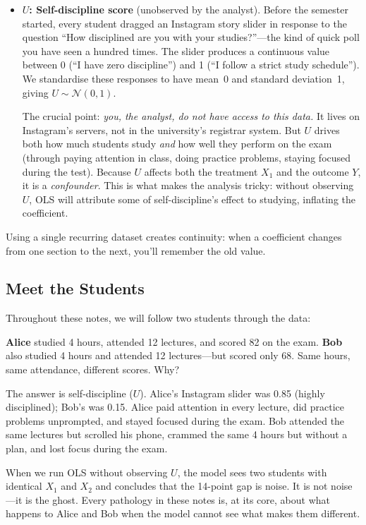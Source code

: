 \documentclass[11pt,a4paper]{article}
\theoremstyle{definition}
\theoremstyle{plain}
\theoremstyle{remark}
\begin{document}
\begin{itemize}
  \item \textbf{$U$: Self-discipline score} (unobserved by the analyst).
    Before the semester started, every student dragged an Instagram story slider in response to the question ``How disciplined are you with your studies?''---the kind of quick poll you have seen a hundred times.
    The slider produces a continuous value between 0 (``I have zero discipline'') and 1 (``I follow a strict study schedule'').
    We standardise these responses to have mean~0 and standard deviation~1, giving $U \sim \mathcal{N}(0,1)$.

    The crucial point: \emph{you, the analyst, do not have access to this data.}
    It lives on Instagram's servers, not in the university's registrar system.
    But $U$ drives both how much students study \emph{and} how well they perform on the exam (through paying attention in class, doing practice problems, staying focused during the test).
    Because $U$ affects both the treatment $X_1$ and the outcome $Y$, it is a \emph{confounder}.
    This is what makes the analysis tricky: without observing $U$, OLS will attribute some of self-discipline's effect to studying, inflating the coefficient.
\end{itemize}

Using a single recurring dataset creates continuity: when a coefficient changes from one section to the next, you'll remember the old value.

\subsection{Meet the Students}

Throughout these notes, we will follow two students through the data:

\textbf{Alice} studied 4 hours, attended 12 lectures, and scored 82 on the exam. \textbf{Bob} also studied 4 hours and attended 12 lectures---but scored only 68. Same hours, same attendance, different scores. Why?

The answer is self-discipline ($U$). Alice's Instagram slider was 0.85 (highly disciplined); Bob's was 0.15. Alice paid attention in every lecture, did practice problems unprompted, and stayed focused during the exam. Bob attended the same lectures but scrolled his phone, crammed the same 4 hours but without a plan, and lost focus during the exam.

When we run OLS without observing $U$, the model sees two students with identical $X_1$ and $X_2$ and concludes that the 14-point gap is noise. It is not noise---it is the ghost. Every pathology in these notes is, at its core, about what happens to Alice and Bob when the model cannot see what makes them different.
\end{document}

